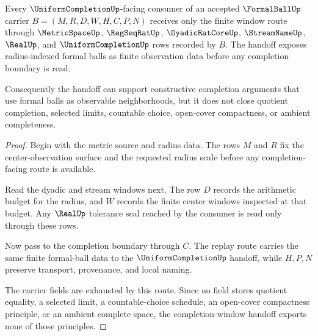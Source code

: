 \begin{theorem}
\label{thm:formalball-completion-window-handoff}
Every $\UniformCompletionUp$-facing consumer of an accepted $\FormalBallUp$ carrier $B=(M,R,D,W,H,C,P,N)$ receives only the finite window route through $\MetricSpaceUp$, $\RegSeqRatUp$, $\DyadicRatCoreUp$, $\StreamNameUp$, $\RealUp$, and $\UniformCompletionUp$ rows recorded by $B$. The handoff exposes radius-indexed formal balls as finite observation data before any completion boundary is read.

Consequently the handoff can support constructive completion arguments that use formal balls as observable neighborhoods, but it does not close quotient completion, selected limits, countable choice, open-cover compactness, or ambient completeness.
\end{theorem}
\begin{proof}
Begin with the metric source and radius data. The rows $M$ and $R$ fix the center-observation surface and the requested radius scale before any completion-facing route is available.

Read the dyadic and stream windows next. The row $D$ records the arithmetic budget for the radius, and $W$ records the finite center windows inspected at that budget. Any $\RealUp$ tolerance seal reached by the consumer is read only through these rows.

Now pass to the completion boundary through $C$. The replay route carries the same finite formal-ball data to the $\UniformCompletionUp$ handoff, while $H,P,N$ preserve transport, provenance, and local naming.

The carrier fields are exhausted by this route. Since no field stores quotient equality, a selected limit, a countable-choice schedule, an open-cover compactness principle, or an ambient complete space, the completion-window handoff exports none of those principles.
\end{proof}

